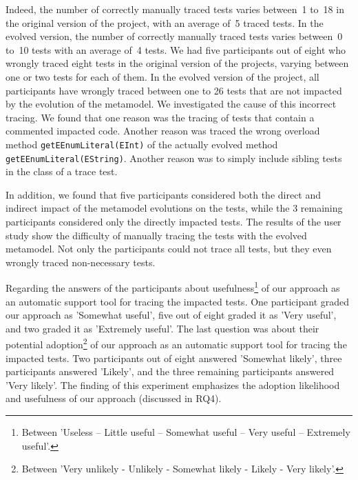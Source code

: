 {Indeed, the number of correctly manually traced tests varies between~1 to~18 in the original version of the project, with an average of~5 traced tests. In the evolved version, the number of correctly manually traced tests varies between~0 to~10 tests with an average of~4 tests. 
We had five participants out of eight who wrongly traced eight tests in the original version of the projects, varying between one or two tests for each of them. In the evolved version of the project, all participants have wrongly traced between one to 26 tests that are not impacted by the evolution of the metamodel. 
We investigated the cause of this incorrect tracing. We found that one reason was the tracing  of tests that contain a commented impacted code. 
Another reason was traced the wrong overload method \texttt{getEEnumLiteral(EInt)} of the actually evolved method \texttt{getEEnumLiteral(EString)}. Another reason was to simply include sibling tests in the class of a trace test. 

In addition, we found that five participants considered both the direct and indirect impact of the metamodel evolutions on the tests, while the 3 remaining participants considered only the directly impacted tests. 
%
The results of the user study show the difficulty of manually tracing the tests with the evolved metamodel. Not only the participants could not trace all tests, but they even wrongly traced non-necessary tests. 

Regarding the answers of the participants about usefulness\footnote{Between 'Useless – Little useful – Somewhat useful – Very useful – Extremely useful'.} of our approach as an automatic support tool for tracing the impacted tests. One participant graded our approach as 'Somewhat useful', five out of eight graded it as 'Very useful', and two graded it as 'Extremely useful'. The last question was about their potential adoption\footnote{Between 'Very unlikely - Unlikely - Somewhat likely - Likely - Very likely'.}%
of our approach as an automatic support tool for tracing the impacted tests. Two participants out of eight answered 'Somewhat likely', three participants answered 'Likely', and the three remaining participants answered 'Very likely'. The finding of this experiment emphasizes the adoption likelihood and usefulness of our approach (discussed in RQ4).

}
